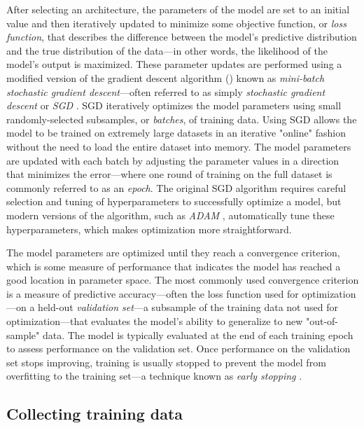\documentclass[11pt,a4paper,oneside]{article}
\begin{document}
\begin{appendices}
After selecting an architecture, the parameters of the model are set to an initial value and then iteratively updated to minimize some objective function, or \textit{loss function}, that describes the difference between the model's predictive distribution and the true distribution of the data—in other words, the likelihood of the model's output is maximized. These parameter updates are performed using a modified version of the gradient descent algorithm (\citealt{cauchy1847methode}) known as \textit{mini-batch stochastic gradient descent}—often referred to as simply \textit{stochastic gradient descent} or \textit{SGD} \citep{robbins1951stochastic,kiefer1952stochastic}. SGD iteratively optimizes the model parameters using small randomly-selected subsamples, or \textit{batches}, of training data. Using SGD allows the model to be trained on extremely large datasets in an iterative "online" fashion without the need to load the entire dataset into memory. The model parameters are updated with each batch by adjusting the parameter values in a direction that minimizes the error—where one round of training on the full dataset is commonly referred to as an \textit{epoch}. The original SGD algorithm requires careful selection and tuning of hyperparameters to successfully optimize a model, but modern versions of the algorithm, such as \textit{ADAM} \citep{kingma2014adam}, automatically tune these hyperparameters, which makes optimization more straightforward.

The model parameters are optimized until they reach a convergence criterion, which is some measure of performance that indicates the model has reached a good location in parameter space. The most commonly used convergence criterion is a measure of predictive accuracy—often the loss function used for optimization—on a held-out \textit{validation set}—a subsample of the training data not used for optimization—that evaluates the model's ability to generalize to new "out-of-sample" data. The model is typically evaluated at the end of each training epoch to assess performance on the validation set. Once performance on the validation set stops improving, training is usually stopped to prevent the model from overfitting to the training set—a technique known as \textit{early stopping} \citep{prechelt1998automatic}.



\subsection{Collecting training data}
\label{app:training_data}


\end{appendices}
\end{document}
